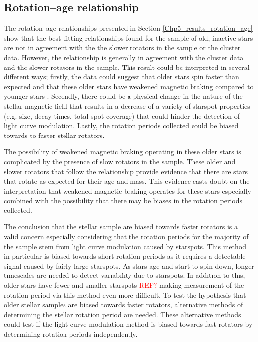 \subsection{Rotation--age relationship}
The rotation--age relationships presented in Section \ref{Chp5_results_rotation_age} show that the best--fitting relationships found for the sample of old, inactive stars are not in agreement with the the slower rotators in the sample or the cluster data. However, the \citet{Barnes_2007} relationship is generally in agreement with the cluster data and the slower rotators in the sample. This result could be interpreted in several different ways; firstly, the data could suggest that older stars spin faster than expected and that these older stars have weakened magnetic braking compared to younger stars \citep{van_Saders_etal_2016}. Secondly, there could be a physical change in the nature of the stellar magnetic field that results in a decrease of a variety of starspot properties (e.g. size, decay times, total spot coverage) that could hinder the detection of light curve modulation. Lastly, the rotation periods collected could be biased towards to faster stellar rotators.

The possibility of weakened magnetic braking operating in these older stars is complicated by the presence of slow rotators in the sample. These older and slower rotators that follow the \citet{Barnes_2007} relationship provide evidence that there are stars that rotate as expected for their age and mass. This evidence casts doubt on the interpretation that weakened magnetic braking operates for these stars especially combined with the possibility that there may be biases in the rotation periods collected.

The conclusion that the stellar sample are biased towards faster rotators is a valid concern especially considering that the rotation periods for the majority of the sample stem from light curve modulation caused by starspots. This method in particular is biased towards short rotation periods as it requires a detectable signal caused by fairly large starspots. As stars age and start to spin down, longer timescales are needed to detect variability due to starspots. In addition to this, older stars have fewer and smaller starspots \textcolor{red}{REF?} making measurement of the rotation period via this method even more difficult. To test the hypothesis that older stellar samples are biased towards faster rotators, alternative methods of determining the stellar rotation period are needed. These alternative methods could test if the light curve modulation method is biased towards fast rotators by determining rotation periods independently.

